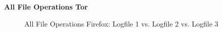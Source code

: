 \begin{appendices}
		\huge{\textbf{All File Operations Tor}}
		\begin{figure}[h!]
			\centerline{}
			\caption{All File Operations Firefox: Logfile 1 vs. Logfile 2 vs. Logfile 3}
		\end{figure}
	
	
\end{appendices}